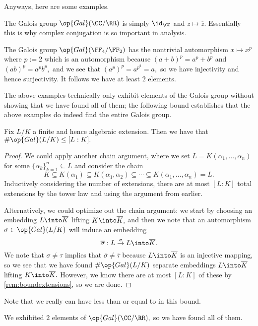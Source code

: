 Anyways, here are some examples.
\begin{example}
	The Galois group $\op{Gal}(\CC/\RR)$ is simply $\id_\CC$ and $z\mapsto\overline z.$ Essentially this is why complex conjugation is so important in analysis.
\end{example}
\begin{example}
	The Galois group $\op{Gal}(\FF_4/\FF_2)$ has the nontrivial automorphism $x\mapsto x^p$ where $p:=2$ which is an automorphism because $(a+b)^p=a^p+b^p$ and $(ab)^p=a^pb^p,$ and we see that $\left(a^p\right)^p=a^{p^2}=a,$ so we have injectivity and hence surjectivity. It follows we have at least $2$ elements.
\end{example}
The above examples technically only exhibit elements of the Galois group without showing that we have found all of them; the following bound establishes that the above examples do indeed find the entire Galois group.
\begin{proposition}
	Fix $L/K$ a finite and hence algebraic extension. Then we have that $\#\op{Gal}(L/K)\le[L:K].$
\end{proposition}
\begin{proof}
	We could apply another chain argument, where we set $L=K(\alpha_1,\ldots,\alpha_n)$ for some $\{\alpha_k\}_{k=1}^n\subseteq L$ and consider the chain
	\[K\subseteq K(\alpha_1)\subseteq K(\alpha_1,\alpha_2)\subseteq\cdots\subseteq K(\alpha_1,\ldots,\alpha_n)=L.\]
	Inductively considering the number of extensions, there are at most $[L:K]$ total extensions by the tower law and using the argument from earlier.

	Alternatively, we could optimize out the chain argument: we start by choosing an embedding $L\into\overline K$ lifting $K\into\overline K,$ and then we note that an automorphism $\sigma\in\op{Gal}(L/K)$ will induce an embedding
	\[\overline\sigma:L\stackrel\sigma\to L\into\overline K.\]
	We note that $\sigma\ne\tau$ implies that $\overline\sigma\ne\overline\tau$ because $L\into\overline K$ is an injective mapping, so we see that we have found $\#\op{Gal}(L/K)$ separate embeddings $L\into\overline K$ lifting $K\into\overline K.$ However, we know there are at most $[L:K]$ of these by \autoref{rem:boundextensions}, so we are done.
\end{proof}
Note that we really can have less than or equal to in this bound.
\begin{example}
	We exhibited $2$ elements of $\op{Gal}(\CC/\RR),$ so we have found all of them.
\end{example}
